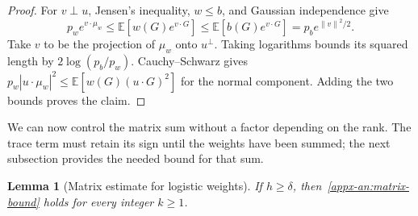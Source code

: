 \documentclass[11pt,letterpaper]{article}
\newtheorem{lemma}{Lemma}
\theoremstyle{remark}
\newcommand{\E}{\mathbb E}
\newcommand{\norm}[1]{\left\lVert#1\right\rVert}
\begin{document}
\begin{proof}
For \(v\perp u\), Jensen's inequality, \(w\le b\), and Gaussian
independence give
\[
 p_we^{v\cdot\mu_w}
 \le\E[w(G)e^{v\cdot G}]
 \le\E[b(G)e^{v\cdot G}]
 =p_be^{\norm v^2/2}.
\]
Take \(v\) to be the projection of \(\mu_w\) onto \(u^\perp\).
Taking logarithms bounds its squared length by
\(2\log(p_b/p_w)\). Cauchy--Schwarz gives
\(p_w|u\cdot\mu_w|^2\le\E[w(G)(u\cdot G)^2]\) for the normal
component. Adding the two bounds proves the claim.
\end{proof}

We can now control the matrix sum without a factor depending on the
rank. The trace term must retain its sign until the weights have been
summed; the next subsection provides the needed bound for that sum.

\begin{lemma}[Matrix estimate for logistic weights]
\label{appx-an:lem:matrix}
If \(h\ge\delta\), then~\eqref{appx-an:matrix-bound} holds for every
integer \(k\ge1\).
\end{lemma}
\end{document}
